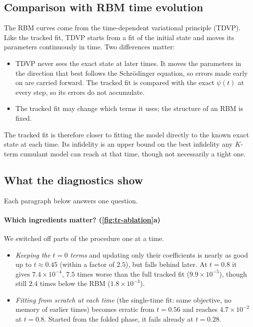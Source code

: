\documentclass[11pt,a4paper]{article}
\begin{document}
\subsection{Comparison with RBM time evolution}
The RBM curves come from the time-dependent variational principle (TDVP). Like the tracked fit, TDVP starts from a fit of the initial state and moves its parameters continuously in time. Two differences matter:
\begin{itemize}
  \item TDVP never sees the exact state at later times. It moves the parameters in the direction that best follows the Schrödinger equation, so errors made early on are carried forward. The tracked fit is compared with the exact $\psi(t)$ at every step, so its errors do not accumulate.
  \item The tracked fit may change which terms it uses; the structure of an RBM is fixed.
\end{itemize}
The tracked fit is therefore closer to fitting the model directly to the known exact state at each time. Its infidelity is an upper bound on the best infidelity any $K$-term cumulant model can reach at that time, though not necessarily a tight one.

\subsection{What the diagnostics show}
Each paragraph below answers one question.

\paragraph{Which ingredients matter? (\cref{fig:tr-ablation}a)} We switched off parts of the procedure one at a time.
\begin{itemize}
  \item \emph{Keeping the $t=0$ terms} and updating only their coefficients is nearly as good up to $t\approx0.45$ (within a factor of $2.5$), but falls behind later. At $t=0.8$ it gives $7.4\times10^{-4}$, $7.5$ times worse than the full tracked fit ($9.9\times10^{-5}$), though still $2.4$ times below the RBM ($1.8\times10^{-3}$).
  \item \emph{Fitting from scratch at each time} (the single-time fit: same objective, no memory of earlier times) becomes erratic from $t=0.56$ and reaches $4.7\times10^{-2}$ at $t=0.8$. Started from the folded phase, it fails already at $t=0.28$.
\end{itemize}
\end{document}
